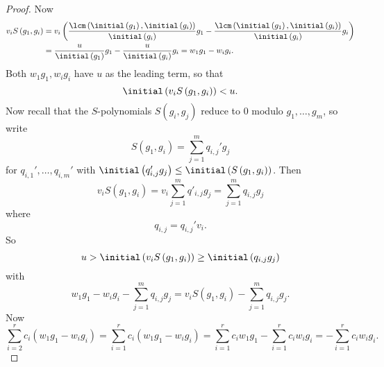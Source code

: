 \documentclass[co439]{subfiles}
\begin{document}
\begin{proof}
        Now
        \begin{equation*}
            \begin{aligned}
                v_i S\left( g_1,g_i \right) & = v_i\left( \frac{\lcm\left( \initial\left( g_1 \right),\initial\left( g_i \right) \right)}{\initial\left( g_i \right)}g_1 - \frac{\lcm\left( \initial\left( g_1 \right),\initial\left( g_i \right) \right)}{\initial\left( g_i \right)}g_i \right) \\
                                            & = \frac{u}{\initial\left( g_1 \right)}g_1 - \frac{u}{\initial\left( g_i \right)}g_i = w_1g_1 - w_ig_i.
            \end{aligned} 
        \end{equation*}
        Both $w_1g_1, w_ig_i$ have $u$ as the leading term, so that
        \begin{equation*}
            \initial\left( v_iS\left( g_1,g_i \right) \right) < u.
        \end{equation*}
        Now recall that the $S$-polynomials $S\left( g_i,g_j \right)$ reduce to $0$ modulo $g_1,\ldots,g_m$, so write
        \begin{equation*}
            S\left( g_1,g_i \right) = \sum^{m}_{j=1} q_{i,j}'g_j
        \end{equation*}
        for $q_{i,1}',\ldots,q_{i,m}'$ with $\initial\left( q_{i,j}'g_j \right)\leq\initial\left( S\left( g_1,g_i \right) \right)$. Then
        \begin{equation*}
            v_iS\left( g_1,g_i \right) = v_i\sum^{m}_{j=1}q'_{i,j}g_j = \sum^{m}_{j=1} q_{i,j}g_j
        \end{equation*}
        where
        \begin{equation*}
            q_{i,j} = q_{i,j}'v_i.
        \end{equation*}
        So
        \begin{equation*}
            u > \initial\left( v_iS\left( g_1,g_i \right) \right) \geq \initial\left( q_{i,j}g_j \right)
        \end{equation*}
        with
        \begin{equation*}
            w_1g_1 - w_ig_i - \sum^{m}_{j=1} q_{i,j}g_j = v_iS\left( g_1,g_i \right) - \sum^{m}_{j=1}q_{i,j}g_j.
        \end{equation*}
        Now
        \begin{equation*}
            \sum^{r}_{i=2} c_i\left( w_1g_1-w_ig_i \right) = \sum^{r}_{i=1} c_i\left( w_1g_1-w_ig_i \right) = \sum^{r}_{i=1}c_iw_1g_1 - \sum^{r}_{i=1}c_iw_ig_i = -\sum^{r}_{i=1}c_iw_ig_i.

\end{equation*}
\end{proof}
\end{document}
